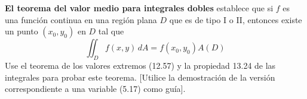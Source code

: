\item \textbf{El teorema del valor medio para integrales dobles} establece que si $f$ es una función continua en una región plana $D$ que es de tipo I o II, entonces existe un punto $(x_0, y_0)$ en $D$ tal que
\[ \iint_D f(x, y) \, dA = f(x_0, y_0) A(D) \]
Use el teorema de los valores extremos (12.57) y la propiedad 13.24 de las integrales para probar este teorema. [Utilice la demostración de la versión correspondiente a una variable (5.17) como guía].
